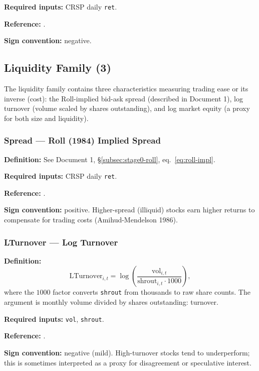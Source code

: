 \textbf{Required inputs:} CRSP daily \texttt{ret}.

\textbf{Reference:} \cite{Goyal2003}.

\textbf{Sign convention:} negative.

\subsection{Liquidity Family (3)}
\label{subsec:stage0-liquidity}

The liquidity family contains three characteristics measuring trading
ease or its inverse (cost): the Roll-implied bid-ask spread (described
in Document 1), log turnover (volume scaled by shares outstanding),
and log market equity (a proxy for both size and liquidity).

\subsubsection{Spread --- Roll (1984) Implied Spread}

\textbf{Definition:} See Document 1, \S\ref{subsec:stage0-roll},
eq.~\eqref{eq:roll-impl}.

\textbf{Required inputs:} CRSP daily \texttt{ret}.

\textbf{Reference:} \cite{Roll1984}.

\textbf{Sign convention:} positive. Higher-spread (illiquid) stocks
earn higher returns to compensate for trading costs (Amihud-Mendelson
1986).

\subsubsection{LTurnover --- Log Turnover}

\textbf{Definition:}
\begin{equation}
\mathrm{LTurnover}_{i,t} = \log\left(
   \frac{\mathrm{vol}_{i,t}}{\mathrm{shrout}_{i,t} \cdot 1000}
\right),
\label{eq:lturnover}
\end{equation}
where the $1000$ factor converts \texttt{shrout} from thousands to raw
share counts. The argument is monthly volume divided by shares
outstanding: turnover.

\textbf{Required inputs:} \texttt{vol}, \texttt{shrout}.

\textbf{Reference:} \cite{LeeSwaminathan2000,Datar1998}.

\textbf{Sign convention:} negative (mild). High-turnover stocks tend
to underperform; this is sometimes interpreted as a proxy for
disagreement or speculative interest.

